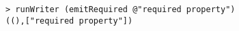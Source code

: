 \begin{repl}\begin{lstlisting}
> runWriter (emitRequired @"required property")
((),["required property"])\end{lstlisting}\end{repl}

